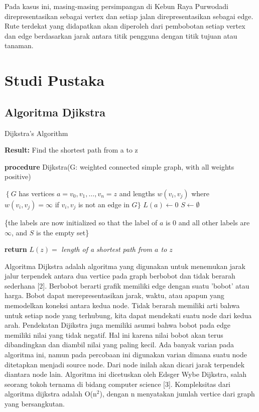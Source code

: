 \documentclass[10pt]{IEEEtran}
\begin{document}
Pada kasus ini, masing-masing persimpangan di Kebun
Raya Purwodadi direpresentasikan sebagai vertex dan setiap
jalan direpresentasikan sebagai edge. Rute terdekat yang didapatkan akan diperoleh dari pembobotan setiap vertex dan edge
berdasarkan jarak antara titik pengguna dengan titik tujuan
atau tanaman.

\section{Studi Pustaka}
\subsection{Algoritma Djikstra}

\begin{algorithm}
\caption{Dijkstra’s Algorithm}
\label{alg:two}

\textbf{Result:} Find the shortest path from a to $\mathrm{z}$

\textbf{procedure} Dijkstra(G: weighted connected simple graph, with all weights positive)

$\left\{G\right.$ has vertices $a=v_{0}, v_{1}, \ldots, v_{n}=z$ and lengths $w\left(v_{i}, v_{j}\right)$ where $w\left(v_{i}, v_{j}\right)=\infty$ if $v_{i}, v_{j}$ is not an edge in $G\}$
$L(a)\gets0$
$S\gets\emptyset$

\{the labels are now initialized so that the label of $a$ is
0 and all other labels are $\infty$, and $S$ is the empty set\}

\textbf{return} $L(z) =$ \textit{length of a shortest path from $a$ to $z$}
\end{algorithm}



Algoritma Dijkstra adalah algoritma yang digunakan untuk
menemukan jarak jalur terpendek antara dua vertice pada
graph berbobot dan tidak berarah sederhana [2]. Berbobot
berarti grafik memiliki edge dengan suatu ’bobot’ atau harga.
Bobot dapat merepresentasikan jarak, waktu, atau apapun
yang memodelkan koneksi antara kedua node. Tidak berarah
memiliki arti bahwa untuk setiap node yang terhubung, kita
dapat mendekati suatu node dari kedua arah. Pendekatan Dijikstra juga memiliki asumsi bahwa bobot pada edge memiliki
nilai yang tidak negatif. Hal ini karena nilai bobot akan
terus dibandingkan dan diambil nilai yang paling kecil. Ada
banyak varian pada algoritma ini, namun pada percobaan
ini digunakan varian dimana suatu node ditetapkan menjadi
source node. Dari node inilah akan dicari jarak terpendek
diantara node lain. Algoritma ini dicetuskan oleh Edsger
Wybe Dijkstra, salah seorang tokoh ternama di bidang computer science [3]. Kompleksitas dari algoritma dijkstra adalah
O(n$^{2}$), dengan n menyatakan jumlah vertice dari graph yang
bersangkutan.
\end{document}
